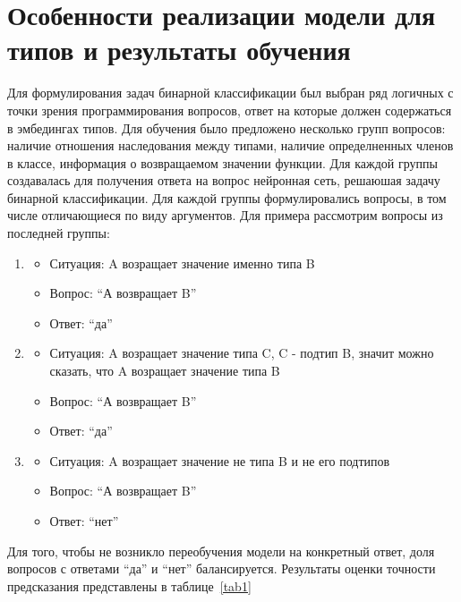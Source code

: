 \documentclass[times,specification,annotation]{itmo-student-thesis}
\begin{document}
\section{Особенности реализации модели для типов и результаты обучения}
Для формулирования задач бинарной классификации был выбран ряд логичных с точки зрения программирования вопросов, ответ на которые должен содержаться в эмбедингах типов. Для обучения было предложено несколько групп вопросов: наличие отношения наследования между типами, наличие определненных членов в классе, информация о возвращаемом значении функции. Для каждой группы создавалась для получения ответа на вопрос нейронная сеть, решаюшая задачу бинарной классификации. Для каждой группы формулировались вопросы, в том числе отличающиеся по виду аргументов. Для примера рассмотрим вопросы из последней группы:
\begin{enumerate}
    \item
        \begin{itemize}
            \item Ситуация: A возращает значение именно типа B
            \item Вопрос: ``А возвращает B''
            \item Ответ: ``да''
        \end{itemize}
    \item 
        \begin{itemize}
            \item Ситуация: A возращает значение типа C, C - подтип B, значит можно сказать, что A возращает значение типа B
            \item Вопрос: ``А возвращает B''
            \item Ответ: ``да''
        \end{itemize}
    \item 
        \begin{itemize}
            \item Ситуация: A возращает значение не типа B и не его подтипов
            \item Вопрос: ``А возвращает B''
            \item Ответ: ``нет''
        \end{itemize}
\end{enumerate}

Для того, чтобы не возникло переобучения модели на конкретный ответ, доля вопросов с ответами ``да'' и ``нет'' балансируется. Результаты оценки точности предсказания представлены в таблице~\ref{tab1}
\end{document}
